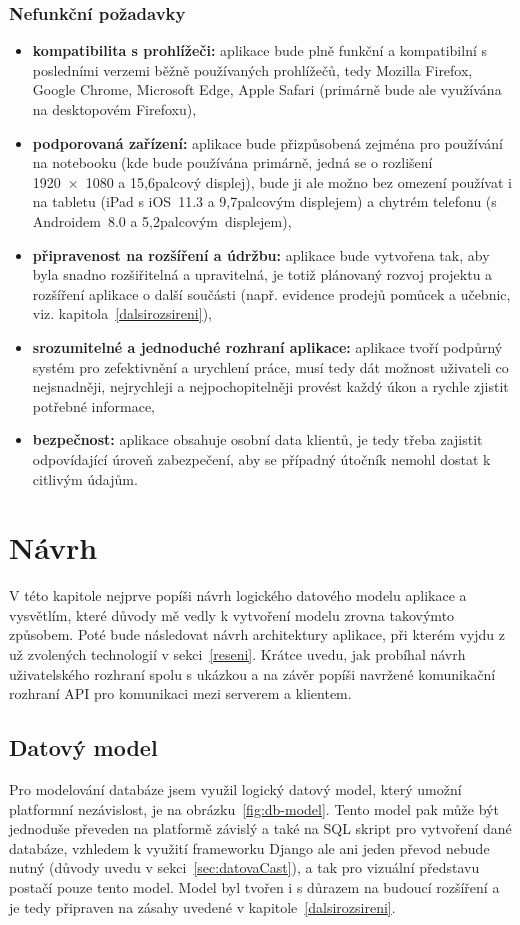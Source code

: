     \subsection{Nefunkční požadavky}
    \begin{itemize}
        \item \textbf{kompatibilita s prohlížeči:} aplikace bude plně funkční a kompatibilní s posledními verzemi běžně používaných prohlížečů, tedy Mozilla Firefox, Google Chrome, Microsoft Edge, Apple Safari (primárně bude ale využívána na desktopovém Firefoxu),
        \item \textbf{podporovaná zařízení:} aplikace bude přizpůsobená zejména pro používání na notebooku (kde bude používána primárně, jedná se o rozlišení 1920~×~1080 a 15,6palcový displej), bude ji ale možno bez omezení používat i na tabletu (iPad s iOS~11.3 a 9,7palcovým displejem) a chytrém telefonu (s Androidem~8.0 a 5,2palcovým~displejem),
        \item \textbf{připravenost na rozšíření a údržbu:} aplikace bude vytvořena tak, aby byla snadno rozšiřitelná a upravitelná, je totiž plánovaný rozvoj projektu a rozšíření aplikace o další součásti (např. evidence prodejů pomůcek a učebnic, viz. kapitola~\ref{dalsirozsireni}),
        \item \textbf{srozumitelné a jednoduché rozhraní aplikace:} aplikace tvoří podpůrný systém pro zefektivnění a urychlení práce, musí tedy dát možnost uživateli co nejsnadněji, nejrychleji a nejpochopitelněji provést každý úkon a rychle zjistit potřebné informace,
        \item \textbf{bezpečnost:} aplikace obsahuje osobní data klientů, je tedy třeba zajistit odpovídající úroveň zabezpečení, aby se případný útočník nemohl dostat k citlivým údajům.
    \end{itemize}
    
\chapter{Návrh}\label{navrh}
V této kapitole nejprve popíši návrh logického datového modelu aplikace a vysvětlím, které důvody mě vedly k vytvoření modelu zrovna takovýmto způsobem. Poté bude následovat návrh architektury aplikace, při kterém vyjdu z už zvolených technologií v sekci~\ref{reseni}. Krátce uvedu, jak probíhal návrh uživatelského rozhraní spolu s ukázkou a na závěr popíši navržené komunikační rozhraní API pro komunikaci mezi serverem a klientem. 

    \section{Datový model}\label{datovymodel}
    Pro modelování databáze jsem využil logický datový model, který umožní platformní nezávislost, je na obrázku~\ref{fig:db-model}. Tento model pak může být jednoduše převeden na platformě závislý a také na SQL skript pro vytvoření dané databáze, vzhledem k využití frameworku Django ale ani jeden převod nebude nutný (důvody uvedu v sekci~\ref{sec:datovaCast}), a tak pro vizuální představu postačí pouze tento model. Model byl tvořen i s důrazem na budoucí rozšíření a je tedy připraven na zásahy uvedené v kapitole~\ref{dalsirozsireni}.
    
